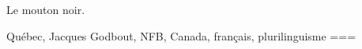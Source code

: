 Le mouton noir.

Québec, Jacques Godbout, NFB, Canada, français, plurilinguisme
===
\nocite{godbout1992}